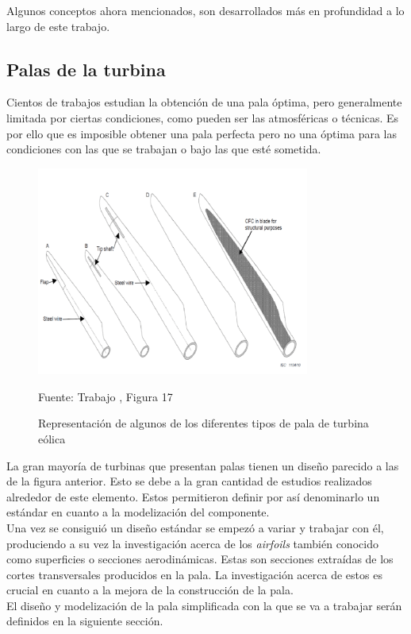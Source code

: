 Algunos conceptos ahora mencionados, son desarrollados más en profundidad a lo largo de este trabajo.

\subsection{Palas de la turbina}

Cientos de trabajos estudian la obtención de una pala óptima, pero generalmente limitada por ciertas condiciones, como pueden ser las atmosféricas o técnicas. Es por ello que es imposible obtener una pala perfecta pero no una óptima para las condiciones con las que se trabajan o bajo las que esté sometida.


\begin{figure}[H] 
    \centering
    \includegraphics[width=0.8\textwidth]{images/tipos pala.PNG}
    \caption{Representación de algunos de los diferentes tipos de pala de turbina eólica}
    Fuente: Trabajo \cite{Tesauro2014}, Figura 17
    \label{fig:tipos_pala}
\end{figure}

La gran mayoría de turbinas que presentan palas tienen un diseño parecido a las de la figura anterior. Esto se debe a la gran cantidad de estudios realizados alrededor de este elemento. Estos permitieron definir por así denominarlo un estándar en cuanto a la modelización del componente.\\

Una vez se consiguió un diseño estándar se empezó a variar y trabajar con él, produciendo a su vez la investigación acerca de los \textit{airfoils} también conocido como superficies o secciones aerodinámicas. Estas son secciones extraídas de los cortes transversales producidos en la pala. La investigación acerca de estos es crucial en cuanto a la mejora de la construcción de la pala.\\

El diseño y modelización de la pala simplificada con la que se va a trabajar serán definidos en la siguiente sección.